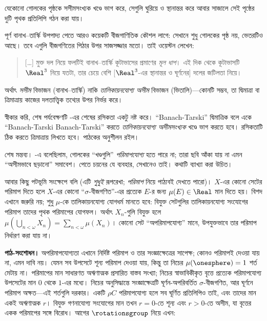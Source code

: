 \documentclass[../../../include/open-logic-section]{subfiles}
\begin{document}
\begin{thm}
যেকোনো গোলকের পৃষ্ঠকে সসীমসংখ্যক খণ্ডে
ভাগ করে, সেগুলি ঘুরিয়ে ও স্থানান্তর করে
আবার সাজালে সেই পৃষ্ঠের দুটি পৃথক
প্রতিলিপি গঠন করা যায়।
\end{thm}

পূর্ণ বানাখ--তার্স্কি উপপাদ্য পেতে
আরও কয়েকটি বীজগাণিতিক কৌশল লাগে:
সেখানে শুধু গোলকের পৃষ্ঠ নয়, ভেতরটিও
আছে। তবে এগুলি বীজগণিতের পিঠার
উপর সাজসজ্জার মতো। তাই ওয়েস্টন লেখেন:
\begin{quote}
  [\ldots] মুক্ত দল নিয়ে ফলটিই
  বানাখ--তার্স্কি কূটাভাসের প্রমাণের
  \emph{মূল ধাপ}। এই দিক থেকে কূটাভাসটি
  $\Real^3$ নিয়ে যতটা, তার চেয়ে বেশি
  [$\Real^3$-এর স্থানান্তর ও ঘূর্ণনের]
  দলের জটিলতা নিয়ে। \cite[p.~16]{Weston2003}
\end{quote}
অর্থাৎ \emph{সসীম} বিভাজন (বানাখ--তার্স্কি)
নাকি \emph{তালিকায়নযোগ্য অসীম} বিভাজন
(ভিতালি)—কোনটি সম্ভব, তা দ্বিমাত্রা বা
ত্রিমাত্রায় কাজের দলতাত্ত্বিক তথ্যের উপর নির্ভর করে।

স্বীকার করি, শেষ পর্যবেক্ষণটি
-এর শেষের রসিকতা
একটু নষ্ট করে। ``Banach-Tarski''
দ্বিমাত্রিক বলে একে
``Banach-Tarski Banach-Tarski'' করতে
\emph{তালিকায়নযোগ্য অসীমসংখ্যক} খণ্ডে
ভাগ করতে হবে। রসিকতাটি ঠিক করতে
ত্রিমাত্রায় লিখতে হবে। পাঠকের অনুশীলন রইল।

শেষ মন্তব্য। -এ
বলেছিলাম, গোলকের ``খণ্ডগুলি''
\emph{পরিমাপযোগ্য} হতে পারে না;
তারা ছবি আঁকা যায় না এমন ``অসীমভাবে
ছড়ানো'' সমাবেশ। 
পেতে চয়নের যে ব্যবহার, সেখানেও তাই।
কথাটি ব্যাখ্যা করা উচিত।

আবার কিছু পটভূমি সংক্ষেপে বলি (এটি
\emph{শুধুই} রূপরেখা; \emph{পরিমাপ}
নিয়ে পাঠ্যবই দেখতে পারো)। $X$-এর
কোনো সেটের পরিমাপ দিতে হলে $X$-এর
কোনো ``$\sigma$-বীজগণিত''-এর প্রত্যেক
$E$-র জন্য $\mu(E)\in\Real$ মান দিতে
হয়। বিশদ এখানে জরুরি নয়; শুধু $\mu$-কে
তালিকায়নযোগ্য যোগধর্ম মানতে হবে:
বিযুক্ত সেটগুলির তালিকায়নযোগ্য সংযোগের
পরিমাপ তাদের পৃথক পরিমাপের যোগফল। অর্থাৎ
$X_n$-গুলি বিযুক্ত হলে
$\mu(\bigcup_{n<\omega}X_n)=
\sum_{n<\omega}\mu(X_n)$। কোনো সেট
``অপরিমাপযোগ্য'' মানে, উপযুক্তভাবে তার
পরিমাপ নির্ধারণ করা যায় না।
\par\noindent\textbf{পাঠ-সংশোধন।} অপরিমাপযোগ্যতা এখানে নির্দিষ্ট পরিমাপ ও তার সংজ্ঞাক্ষেত্রের
সাপেক্ষ; কোনও পরিমাপই দেওয়া যায় না, এমন দাবি নয়। যেমন
সব উপসেটে শূন্য পরিমাপ দেওয়া যায়, কিন্তু তা নিচের
$\mu(\onesphere)=1$ শর্ত মেটায় না। পরিমাপের মান সাধারণত
অঋণাত্মক প্রসারিত বাস্তব সংখ্যা; নিচের স্বাভাবিকীকৃত বৃত্তে
প্রত্যেক পরিমাপযোগ্য উপসেটের মান $0$ থেকে $1$-এর মধ্যে।
নিচের অনুসিদ্ধান্তে সংজ্ঞাক্ষেত্রটি ঘূর্ণন-অপরিবর্তিত
$\sigma$-বীজগণিত, আর ঘূর্ণনে পরিমাপ অক্ষত—এই শর্তগুলি
দরকার। একটি $\rho C$ পরিমাপযোগ্য হলে সব ঘূর্ণিত প্রতিলিপিও
তাই, এবং তাদের মান একই অঋণাত্মক $r$। বিযুক্ত গণনাযোগ্য
সংযোগের মান তখন $r=0$-তে শূন্য এবং $r>0$-তে অসীম,
যা বৃত্তের একক পরিমাপের সঙ্গে বিরোধ।
আগের
$\rotationsgroup$ নিয়ে এখন:
\end{document}
